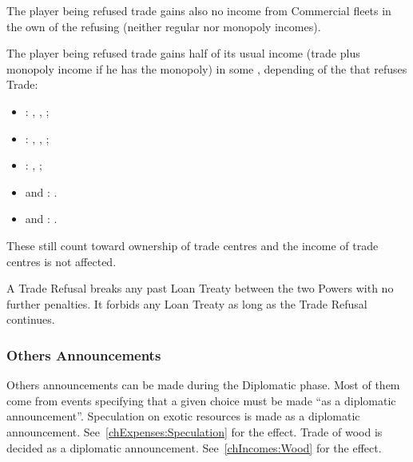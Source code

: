 \bparag The player being refused trade gains also no income from Commercial
fleets in the own \CTZ of the refusing \MAJ (neither regular nor monopoly
incomes).

\bparag The player being refused trade gains half of its usual income (trade
plus monopoly income if he has the monopoly) in some \STZ, depending of the
\MAJ that refuses Trade:
\begin{itemize}
\item \TUR: , , ;
\item \VEN: , , ;
\item \POR: , ;
\item \POL and \SUE: .
\item \HOL and \ENG: .
\end{itemize}

\bparag These \TradeFLEET still count toward ownership of trade centres and
the income of trade centres is not affected.

\aparag A Trade Refusal breaks any past Loan Treaty between the two Powers
with no further penalties. It forbids any Loan Treaty as long as the Trade
Refusal continues.


\subsubsection{Others Announcements}
\aparag Others announcements can be made during the Diplomatic phase.
\bparag Most of them come from events specifying that a given choice must be
made ``as a diplomatic announcement''.
\bparag Speculation on exotic resources is made as a diplomatic
announcement. See~\ref{chExpenses:Speculation} for the effect.
\bparag Trade of wood is decided as a diplomatic
announcement. See~\ref{chIncomes:Wood} for the effect.


